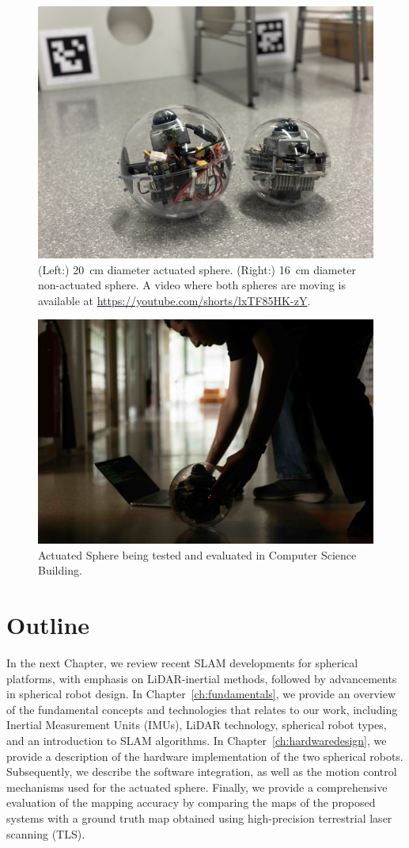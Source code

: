 \documentclass[english, bachelor, utf8]{base/thesis_telematics}
\begin{document}
\begin{figure}[h]
\centerline{\includegraphics[width=0.8\columnwidth]{pics/two_spheres.jpg}}
\caption{(Left:) \SI{20}{\centi\meter} diameter actuated sphere.
(Right:) \SI{16}{\centi\meter} diameter non-actuated sphere.
A video where both spheres are moving is available at \url{https://youtube.com/shorts/lxTF85HK-zY}.}

\label{fig:twospheres}
\end{figure}

\begin{figure}[h]
\centerline{\includegraphics[width=0.8\columnwidth]{pics/marosphere_pic2.jpg}}
\caption{Actuated Sphere being tested and evaluated in Computer Science Building.}
\label{fig:test}
\end{figure}


\section{Outline}
In the next Chapter, we review recent SLAM developments for spherical platforms, with emphasis on LiDAR-inertial methods, followed by advancements in spherical robot design.
In Chapter~\ref{ch:fundamentals}, we provide an overview of the fundamental concepts and technologies that relates to our work, including Inertial Measurement Units (IMUs), LiDAR technology, spherical robot types, and an introduction to SLAM algorithms.
In Chapter~\ref{ch:hardwaredesign}, we provide a description of the hardware implementation of the two spherical robots. 
Subsequently, we describe the software integration, as well as the motion control mechanisms used for the actuated sphere. 
Finally, we provide a comprehensive evaluation of the mapping accuracy by comparing the maps of the proposed systems with a ground truth map obtained using high-precision terrestrial laser scanning (TLS). 
\end{document}
